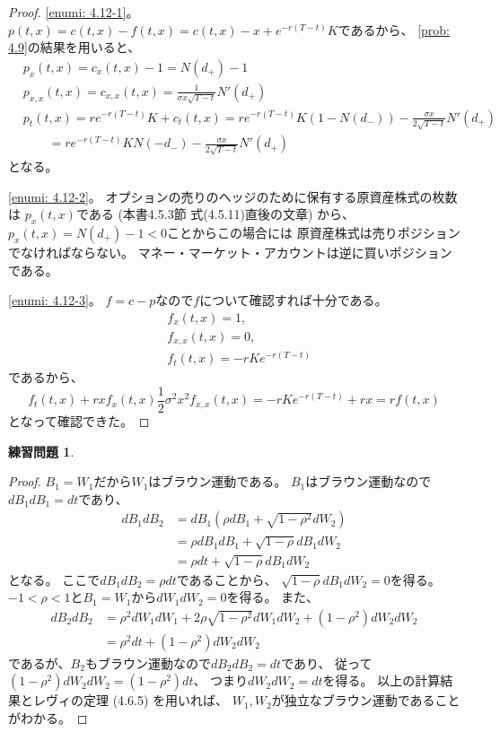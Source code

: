 \documentclass[uplatex]{jsarticle}
\theoremstyle{definition}
\newtheorem{prob}[prob]{練習問題}
\begin{document}
\begin{proof}
  \ref{enumi: 4.12-1}。
  \(p(t,x) = c(t,x) - f(t,x) = c(t,x) - x + e^{-r(T-t)}K\)であるから、
  \autoref{prob: 4.9}の結果を用いると、
  \begin{align*}
    &p_x(t,x) = c_x(t,x) - 1 = N(d_+) - 1 \\
    &p_{x,x}(t,x) = c_{x,x}(t,x)
    = \frac{1}{\sigma x\sqrt{T-t}}N'(d_+) \\
    &p_t(t,x) = re^{-r(T-t)}K + c_t(t,x)
    = re^{-r(T-t)}K\left( 1-N(d_-)\right)
    - \frac{\sigma x}{2\sqrt{T-t}} N'(d_+)  \\
    &\ \ \ \ \ \ \ \ \
    = re^{-r(T-t)}K N(-d_-) - \frac{\sigma x}{2\sqrt{T-t}} N'(d_+)
  \end{align*}
  となる。

  \ref{enumi: 4.12-2}。
  オプションの売りのヘッジのために保有する原資産株式の枚数は
  \(p_x(t,x)\)である (本書4.5.3節 式(4.5.11)直後の文章)
  から、\(p_x(t,x) = N(d_+) - 1 < 0\)ことからこの場合には
  原資産株式は売りポジションでなければならない。
  マネー・マーケット・アカウントは逆に買いポジションである。

  \ref{enumi: 4.12-3}。
  \(f=c-p\)なので\(f\)について確認すれば十分である。
  \begin{align*}
    &f_x(t,x) = 1, \\
    &f_{x,x}(t,x) = 0, \\
    &f_t(t,x) = -rKe^{-r(T-t)}
  \end{align*}
  であるから、
  \[
  f_t(t,x) + rxf_x(t,x) \frac{1}{2}\sigma^2x^2f_{x,x}(t,x)
  = -rKe^{-r(T-t)} + rx = rf(t,x)
  \]
  となって確認できた。
\end{proof}


\begin{prob}\label{prob: 4.13}

\end{prob}

\begin{proof}
  \(B_1=W_1\)だから\(W_1\)はブラウン運動である。
  \(B_1\)はブラウン運動なので\(dB_1dB_1 = dt\)であり、
  \begin{align*}
    dB_1dB_2 &= dB_1 \left( \rho dB_1 + \sqrt{1-\rho^2}dW_2\right) \\
    &= \rho dB_1dB_1 + \sqrt{1-\rho}dB_1dW_2 \\
    &= \rho dt + \sqrt{1-\rho}dB_1dW_2
  \end{align*}
  となる。
  ここで\(dB_1dB_2 = \rho dt\)であることから、
  \(\sqrt{1-\rho}dB_1dW_2 = 0\)を得る。
  \(-1 < \rho < 1\)と\(B_1=W_1\)から\(dW_1dW_2 = 0\)を得る。
  また、
  \begin{align*}
    dB_2dB_2 &= \rho^2dW_1dW_1
    + 2\rho\sqrt{1-\rho^2}dW_1dW_2 + (1-\rho^2) dW_2dW_2 \\
    &= \rho^2 dt + (1-\rho^2) dW_2dW_2
  \end{align*}
  であるが、\(B_2\)もブラウン運動なので\(dB_2dB_2 = dt\)であり、
  従って\((1-\rho^2)dW_2dW_2 = (1-\rho^2)dt\)、
  つまり\(dW_2dW_2 = dt\)を得る。
  以上の計算結果とレヴィの定理 (4.6.5) を用いれば、
  \(W_1,W_2\)が独立なブラウン運動であることがわかる。
\end{proof}
\end{document}
